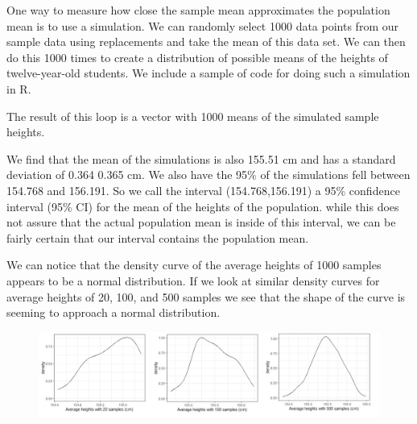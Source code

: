 \documentclass[
]{book}
\newenvironment{Shaded}{\begin{snugshade}}{\end{snugshade}}
\newcommand{\AttributeTok}[1]{\textcolor[rgb]{0.77,0.63,0.00}{#1}}
\newcommand{\CommentTok}[1]{\textcolor[rgb]{0.56,0.35,0.01}{\textit{#1}}}
\newcommand{\ConstantTok}[1]{\textcolor[rgb]{0.00,0.00,0.00}{#1}}
\newcommand{\ControlFlowTok}[1]{\textcolor[rgb]{0.13,0.29,0.53}{\textbf{#1}}}
\newcommand{\DecValTok}[1]{\textcolor[rgb]{0.00,0.00,0.81}{#1}}
\newcommand{\FunctionTok}[1]{\textcolor[rgb]{0.00,0.00,0.00}{#1}}
\newcommand{\NormalTok}[1]{#1}
\newcommand{\OtherTok}[1]{\textcolor[rgb]{0.56,0.35,0.01}{#1}}
\newcommand{\SpecialCharTok}[1]{\textcolor[rgb]{0.00,0.00,0.00}{#1}}
\theoremstyle{definition}
\theoremstyle{definition}
\theoremstyle{definition}
\theoremstyle{definition}
\theoremstyle{remark}
\begin{document}
One way to measure how close the sample mean approximates the population mean is to use a simulation. We can randomly select 1000 data points from our sample data using replacements and take the mean of this data set. We can then do this 1000 times to create a distribution of possible means of the heights of twelve-year-old students. We include a sample of code for doing such a simulation in R.

\begin{Shaded}
\end{Shaded}

The result of this loop is a vector with 1000 means of the simulated sample heights.

We find that the mean of the simulations is also 155.51 cm and has a standard deviation of 0.364 0.365 cm. We also have the 95\% of the simulations fell between 154.768 and 156.191. So we call the interval (154.768,156.191) a 95\% confidence interval (95\% CI) for the mean of the heights of the population. while this does not assure that the actual population mean is inside of this interval, we can be fairly certain that our interval contains the population mean.

We can notice that the density curve of the average heights of 1000 samples appears to be a normal distribution. If we look at similar density curves for average heights of 20, 100, and 500 samples we see that the shape of the curve is seeming to approach a normal distribution.

\begin{figure}

{\centering \includegraphics[width=1\linewidth]{images/heights_averages} 

}

\end{figure}
\end{document}
